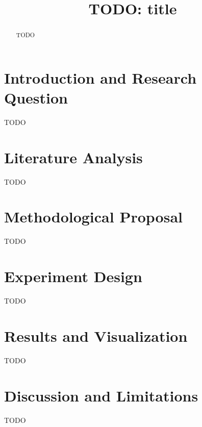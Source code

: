\documentclass[conference]{IEEEtran}
\begin{document}
\title{TODO: title}

\author{
}

\maketitle

\begin{abstract}
TODO
\end{abstract}

\section{Introduction and Research Question}
TODO

\section{Literature Analysis}
TODO

\section{Methodological Proposal}
TODO

\section{Experiment Design}
TODO

\section{Results and Visualization}
TODO

\section{Discussion and Limitations}
TODO



\end{document}
